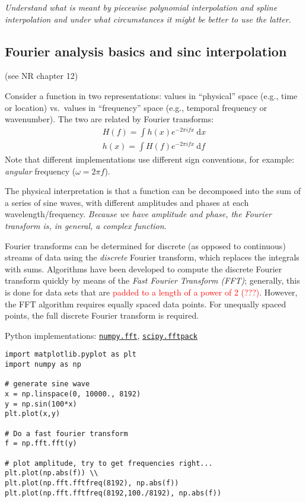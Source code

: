 \documentclass{article}
\newcommand{\test}[1]{%
    \begin{center}
        \colorbox{hl}{\parbox{0.9\textwidth}{\emph{\centering #1}}}
    \end{center}}
\begin{document}
\test{Understand what is meant by piecewise polynomial interpolation and
spline interpolation and under what circumstances it might be better to use
the latter.}

\subsection{Fourier analysis basics and sinc interpolation}
(see NR chapter 12)

Consider a function in two representations: values in
``physical'' space (e.g., time or location) vs.\ values in ``frequency'' space
(e.g., temporal frequency or wavenumber). The two are related by Fourier
transforms:
\begin{align*}
    H(f) = \int \! h(x)e^{-2\pi ifx}\ \textrm{d}x\\
    h(x) = \int\! H(f)e^{-2\pi ifx}\ \textrm{d}f
\end{align*}
Note that different implementations use different sign conventions,
for example: \emph{angular} frequency ($\omega = 2\pi f$).

The physical interpretation is that a function can be decomposed into the sum
of a series of sine waves, with different amplitudes and phases at each
wavelength/frequency. \emph{Because we have amplitude and phase, the Fourier
transform is, in general, a complex function}.

Fourier transforms can be determined for discrete (as opposed to continuous)
streams of data using the \emph{discrete} Fourier transform, which replaces the
integrals with sums. Algorithms have been developed to compute the discrete
Fourier transform quickly by means of the \emph{Fast Fourier Transform (FFT)};
generally, this is done for data sets that are \textcolor{red}
{padded to a length of a power of 2 (???)}.
However, the FFT algorithm requires equally spaced data points. For
unequally spaced points, the full discrete Fourier transform is required.

Python implementations:
\href{http://docs.scipy.org/doc/numpy/reference/routines.fft.html}
{\tt numpy.fft},
\href{http://docs.scipy.org/doc/scipy/reference/tutorial/fftpack.html}
{\tt scipy.fftpack}

\begin{verbatim}
import matplotlib.pyplot as plt
import numpy as np

# generate sine wave
x = np.linspace(0, 10000., 8192)
y = np.sin(100*x)
plt.plot(x,y)

# Do a fast fourier transform
f = np.fft.fft(y)

# plot amplitude, try to get frequencies right...
plt.plot(np.abs(f)) \\
plt.plot(np.fft.fftfreq(8192), np.abs(f))
plt.plot(np.fft.fftfreq(8192,100./8192), np.abs(f))
\end{verbatim}
\end{document}
